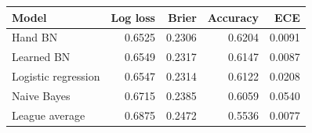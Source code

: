 \begin{tabular}{lrrrr}
\toprule
Model & Log loss & Brier & Accuracy & ECE\\
\midrule
Hand BN & 0.6525 & 0.2306 & 0.6204 & 0.0091\\
Learned BN & 0.6549 & 0.2317 & 0.6147 & 0.0087\\
Logistic regression & 0.6547 & 0.2314 & 0.6122 & 0.0208\\
Naive Bayes & 0.6715 & 0.2385 & 0.6059 & 0.0540\\
League average & 0.6875 & 0.2472 & 0.5536 & 0.0077\\
\bottomrule
\end{tabular}
